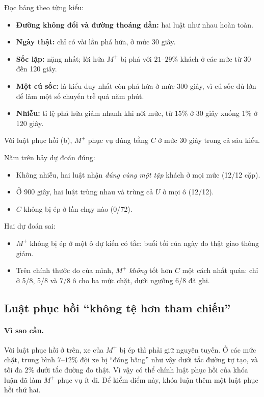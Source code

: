 Đọc bảng theo từng kiểu:
\begin{itemize}
\item \textbf{Đường không đổi và đường thoáng dần:} hai luật như nhau hoàn toàn.
\item \textbf{Ngày thật:} chỉ có vài lần phá hứa, ở mức 30 giây.
\item \textbf{Sốc lặp:} nặng nhất; lời hứa $M^{+}$ bị phá với $21$--$29\%$ khách ở các mức từ 30 đến 120 giây.
\item \textbf{Một cú sốc:} là kiểu duy nhất còn phá hứa ở mức 300 giây, vì cú sốc đủ lớn để làm một số
chuyến trễ quá năm phút.
\item \textbf{Nhiễu:} tỉ lệ phá hứa giảm nhanh khi nới mức, từ $15\%$ ở 30 giây xuống $1\%$ ở 120 giây.
\end{itemize}
Với luật phục hồi (b), $M^{+}$ phục vụ đúng bằng $C$ ở mức 30 giây trong cả sáu kiểu.

Năm trên bảy dự đoán đúng:
\begin{itemize}
\item Không nhiễu, hai luật nhận \emph{đúng cùng một tập} khách ở mọi mức (12/12 cặp).
\item Ở 900 giây, hai luật trùng nhau và trùng cả $U$ ở mọi ô (12/12).
\item $C$ không bị ép ở lần chạy nào (0/72).
\end{itemize}

Hai dự đoán sai:
\begin{itemize}
\item $M^{+}$ không bị ép ở một ô dự kiến có tắc: buổi tối của ngày đo thật giao thông giảm.
\item Trên chính thước đo của mình, $M^{+}$ \emph{không} tốt hơn $C$ một cách nhất quán: chỉ ở 5/8, 5/8
và 7/8 ô cho ba mức chặt, dưới ngưỡng 6/8 đã ghi.
\end{itemize}

\subsection{Luật phục hồi ``không tệ hơn tham chiếu''}

\paragraph{Vì sao cần.} Với luật phục hồi ở trên, xe của $M^{+}$ bị ép thì phải giữ nguyên tuyến. Ở các
mức chặt, trung bình $7$--$12\%$ đội xe bị ``đóng băng'' như vậy dưới tắc đường tự tạo, và tối đa $2\%$
dưới tắc đường đo thật. Vì vậy có thể chính luật phục hồi của khóa luận đã làm $M^{+}$ phục vụ ít đi. Để kiểm điểm này, khóa luận thêm một luật phục hồi thứ hai.

